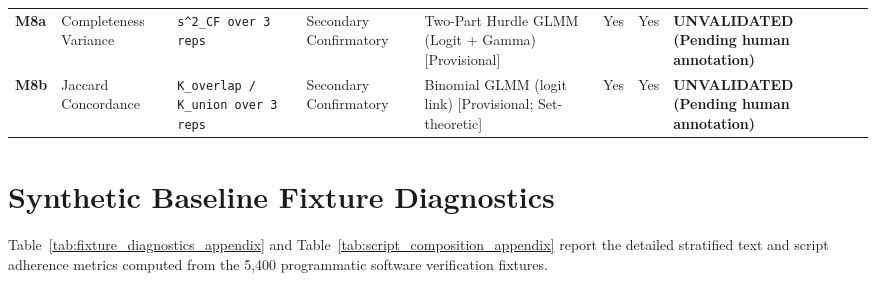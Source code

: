 \documentclass[11pt,a4paper]{article}
\begin{document}
\begin{longtable}{p{1.0cm} p{2.2cm} p{3.2cm} p{1.8cm} p{2.8cm} c c p{2.0cm}}
\addlinespace
\textbf{M8a} & Completeness Variance & \texttt{s\textasciicircum 2\_CF over 3 reps} & Secondary Confirmatory & Two-Part Hurdle GLMM (Logit + Gamma) [Provisional] & Yes & Yes & \textbf{UNVALIDATED (Pending human annotation)} \\
\addlinespace
\textbf{M8b} & Jaccard Concordance & \texttt{K\_overlap / K\_union over 3 reps} & Secondary Confirmatory & Binomial GLMM (logit link) [Provisional; Set-theoretic] & Yes & Yes & \textbf{UNVALIDATED (Pending human annotation)} \\
\end{longtable}

\section{Synthetic Baseline Fixture Diagnostics}
\label{sec:appendix_diagnostics}

Table~\ref{tab:fixture_diagnostics_appendix} and Table~\ref{tab:script_composition_appendix} report the detailed stratified text and script adherence metrics computed from the 5,400 programmatic software verification fixtures.
\end{document}
